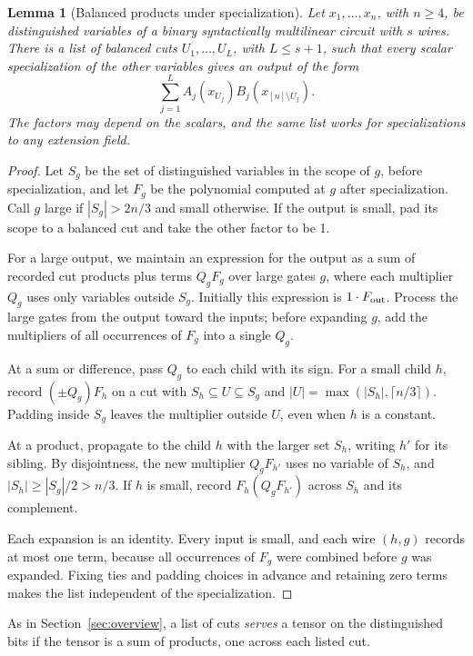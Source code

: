 \documentclass[11pt]{article}
\newtheorem{lemma}[theorem]{Lemma}
\theoremstyle{remark}
\begin{document}
\begin{lemma}[Balanced products under specialization]\label{lem:cut}
Let \(x_1,\ldots,x_n\), with \(n\ge4\), be distinguished variables of a
binary syntactically multilinear circuit with \(s\) wires. There is a list of balanced cuts \(U_1,\ldots,U_L\), with \(L\le s+1\),
such that every scalar specialization of the other variables gives an output
of the form
\[
                  \sum_{j=1}^{L} A_j(x_{U_j})B_j(x_{[n]\setminus U_j}).
\]
The factors may depend on the scalars, and the same list works for
specializations to any extension field.
\end{lemma}
\begin{proof}
Let \(S_g\) be the set of distinguished variables in the scope of \(g\),
before specialization, and let \(F_g\) be the polynomial computed at \(g\)
after specialization. Call \(g\) large if \(|S_g|>2n/3\) and small otherwise.
If the output is small, pad its scope to a balanced cut and take the other
factor to be 1.

For a large output, we maintain an expression for the output as a sum of
recorded cut products plus terms \(Q_gF_g\) over large gates \(g\), where
each multiplier \(Q_g\) uses only variables outside \(S_g\). Initially this
expression is \(1\cdot F_{\rm out}\). Process the large gates from the output
toward the inputs; before expanding \(g\), add the multipliers of all
occurrences of \(F_g\) into a single \(Q_g\).

At a sum or difference, pass \(Q_g\) to each child with its sign. For a
small child \(h\), record \((\pm Q_g)F_h\) on a cut with
\(S_h\subseteq U\subseteq S_g\) and
\(|U|=\max(|S_h|,\lceil n/3\rceil)\). Padding inside \(S_g\) leaves the
multiplier outside \(U\), even when \(h\) is a constant.

At a product, propagate to the child \(h\) with the larger set \(S_h\),
writing \(h'\) for its sibling. By disjointness, the new multiplier
\(Q_gF_{h'}\) uses no variable of \(S_h\), and \(|S_h|\ge |S_g|/2>n/3\).
If \(h\) is small, record \(F_h(Q_gF_{h'})\) across \(S_h\) and its complement.

Each expansion is an identity. Every input is small, and each wire
\((h,g)\) records at most one term, because all occurrences of \(F_g\) were
combined before \(g\) was expanded. Fixing ties and padding choices in advance and retaining
zero terms makes the list independent of the specialization.
\end{proof}

As in Section~\ref{sec:overview}, a list of cuts \emph{serves} a tensor
on the distinguished bits if the tensor is a sum of products, one across
each listed cut.
\end{document}
